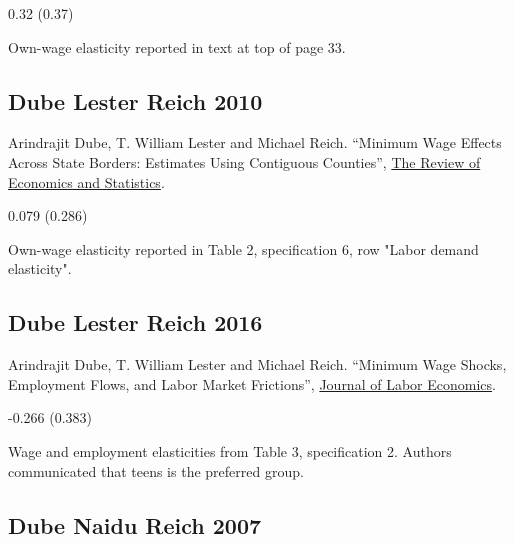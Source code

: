 \vspace{0.7em}

 0.32 (0.37)

\vspace{0.7em}

 Own-wage elasticity reported in text at top of page 33.

\subsection*{Dube Lester Reich 2010}
\vspace{-0.7em}

\noindent Arindrajit Dube, T. William Lester and Michael Reich. ``Minimum Wage Effects Across State Borders: Estimates Using Contiguous Counties'', \href{https://doi.org/10.1162/REST_a_00039}{The Review of Economics and Statistics}.

\vspace{0.7em}

 0.079 (0.286)

\vspace{0.7em}

 Own-wage elasticity reported in Table 2, specification 6, row "Labor demand elasticity".

\subsection*{Dube Lester Reich 2016}
\vspace{-0.7em}

\noindent Arindrajit Dube, T. William Lester and Michael Reich. ``Minimum Wage Shocks, Employment Flows, and Labor Market Frictions'', \href{https://doi.org/10.1086/685449}{Journal of Labor Economics}.

\vspace{0.7em}

 -0.266 (0.383)

\vspace{0.7em}

 Wage and employment elasticities from Table 3, specification 2. Authors communicated that teens is the preferred group.

\subsection*{Dube Naidu Reich 2007}
\vspace{-0.7em}

